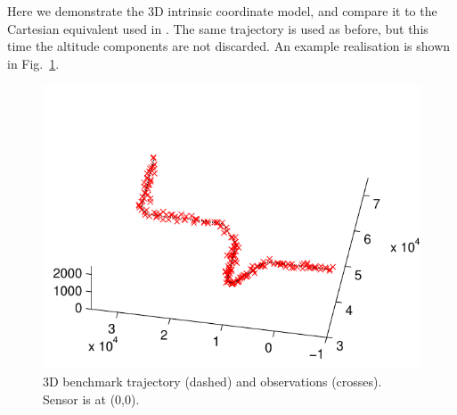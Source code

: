 \documentclass[conference]{IEEEtran}
\begin{document}
Here we demonstrate the 3D intrinsic coordinate model, and compare it to the Cartesian equivalent used in \cite{Whiteley2007a,Whiteley2011}. The same trajectory is used as before, but this time the altitude components are not discarded. An example realisation is shown in Fig.~\ref{fig:3D_ground_truth}.
%
\begin{figure}
\centering
\includegraphics[width=0.95\columnwidth]{images/3Dbenchmark_problem.pdf}
\caption{3D benchmark trajectory (dashed) and observations (crosses). Sensor is at (0,0).}
\label{fig:3D_ground_truth}
\end{figure}
\end{document}
